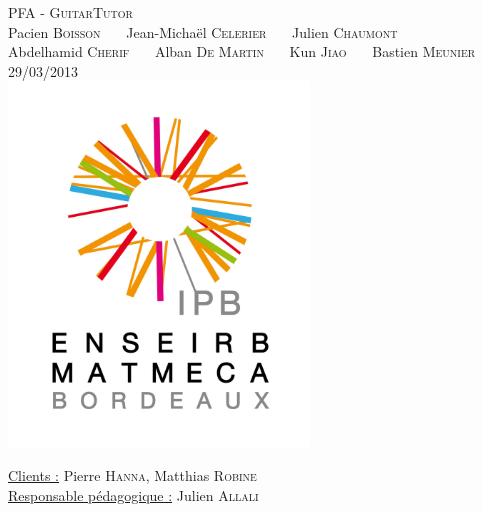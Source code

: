 \documentclass[a4paper,11pt]{article}
\begin{document}
\begin{titlepage}
  \begin{center}

    \textsc{\LARGE PFA - GuitarTutor}\\[2cm]
    Pacien \textsc{Boisson} \ \ \ Jean-Michaël \textsc{Celerier}  \ \ \ Julien \textsc{Chaumont}\\
    Abdelhamid \textsc{Cherif} \ \ \ Alban \textsc{De Martin} \ \ \ Kun \textsc{Jiao} \ \ \ Bastien \textsc{Meunier} \\[3cm]
    \textsc{\large 29/03/2013 }\\[1.5cm]
    \includegraphics[width=8cm]{logo.png}

  \end{center}
  \vspace{3cm}
  \begin{flushleft}
   \underline{Clients :} Pierre \textsc{Hanna}, Matthias \textsc{Robine}\\
   \underline{Responsable pédagogique :} Julien \textsc{Allali}
  \end{flushleft}


\end{titlepage}



\tableofcontents








\end{document}
